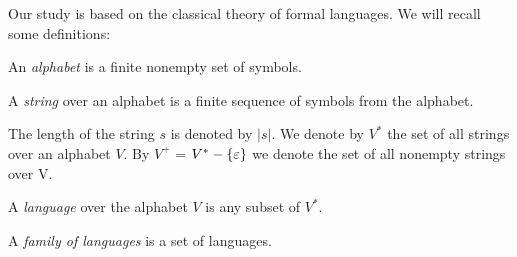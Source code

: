 Our study is based on the classical theory of formal languages. We will recall some definitions:

\begin{definition}
An {\em alphabet} is a finite nonempty set of symbols.
\end{definition}

\begin{definition}
A {\em string} over an alphabet is a finite sequence of symbols from the alphabet.
\end{definition}

The length of the string $s$ is denoted by $|s|$. We denote by $V^*$ the set of all strings over an alphabet $V$. By $V^+$ = $V^* - \{\varepsilon\}$ we denote the set of all nonempty strings over V.

\begin{definition}
A {\em language} over the alphabet $V$ is any subset of $V^*$.
\end{definition}

\begin{definition}
A {\em family of languages} is a set of languages.
\end{definition}

